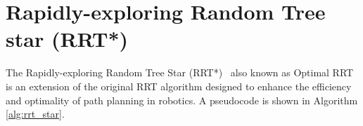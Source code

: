 \documentclass{ctuthesis}
\begin{document}
\section{Rapidly-exploring Random Tree star (RRT*)}
 
The Rapidly-exploring Random Tree Star (RRT*)~\cite{karaman2011rrtstar} also known as 
Optimal RRT is an extension of the original RRT algorithm 
designed to enhance the efficiency and optimality of path planning in robotics.
A pseudocode is shown in Algorithm \hyperref[alg:rrt_star]{\ref*{alg:rrt_star}}. 
\end{document}
